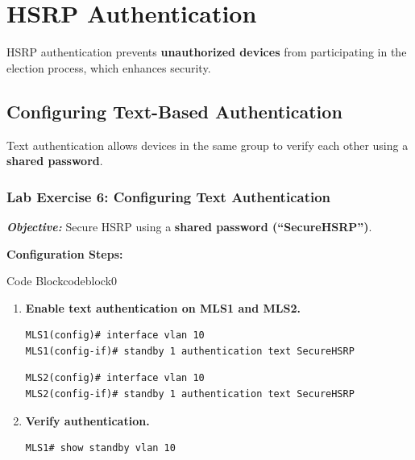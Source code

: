 \documentclass[a4paper]{book}
\begin{document}
\section{HSRP Authentication}
HSRP authentication prevents \textbf{unauthorized devices} from participating in the 
election process, which enhances security.

\subsection{Configuring Text-Based Authentication}
Text authentication allows devices in the same group to verify each other using a 
\textbf{shared password}.

\subsubsection{Lab Exercise 6: Configuring Text Authentication}
\textbf{\textit{Objective:}} Secure HSRP using a \textbf{shared password (``SecureHSRP'')}.
\vspace{1.5em}

\textbf{Configuration Steps:}

\vspace{1.5em}


\begin{ocg}{Code Block}{codeblock}{0}


\vspace{0.5cm}
\begin{enumerate}
\item \textbf{Enable text authentication on MLS1 and MLS2.}
\begin{lstlisting}
MLS1(config)# interface vlan 10
MLS1(config-if)# standby 1 authentication text SecureHSRP
\end{lstlisting}
\begin{lstlisting}
MLS2(config)# interface vlan 10
MLS2(config-if)# standby 1 authentication text SecureHSRP
\end{lstlisting}

\item \textbf{Verify authentication.}
\begin{lstlisting}
MLS1# show standby vlan 10
\end{lstlisting}
\end{enumerate}
\end{ocg}
\end{document}
